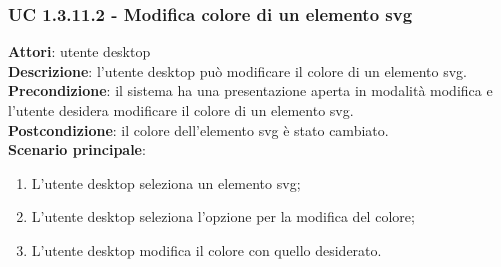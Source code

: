 \subsubsection{UC 1.3.11.2 - Modifica colore di un elemento svg}{
	\label{uc1.3.11.2}
	\textbf{Attori}: utente desktop \\
	\textbf{Descrizione}: l'utente desktop può modificare il colore di un elemento svg. \\
	\textbf{Precondizione}: il sistema ha una presentazione aperta in modalità modifica e l'utente desidera modificare il colore di un elemento svg.	\\
	\textbf{Postcondizione}: il colore dell'elemento svg è stato cambiato.	\\
	\textbf{Scenario principale}:
	\begin{enumerate}
		\item L'utente desktop seleziona un elemento svg;
		\item L'utente desktop seleziona l'opzione per la modifica del colore;
		\item L'utente desktop modifica il colore con quello desiderato.
	\end{enumerate}
	}